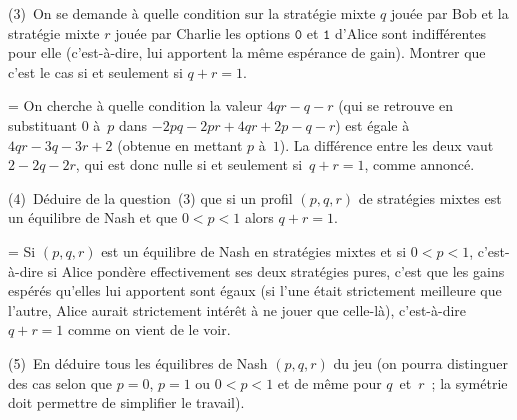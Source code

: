 \documentclass[12pt,a4paper]{article}
\theoremstyle{definition}
\newif\ifcorrige
\newenvironment{corrige}%
{\ifcorrige\relax\else\setbox0=\vbox\bgroup\fi%
\smallbreak\noindent{\underbar{\textit{Corrigé.}}\quad}}
{{\hbox{}\nobreak\hfill\checkmark}%
\ifcorrige\relax\else\egroup\fi\par}
\begin{document}
(3) On se demande à quelle condition sur la stratégie mixte $q$ jouée
par Bob et la stratégie mixte $r$ jouée par Charlie les options
$\mathtt{0}$ et $\mathtt{1}$ d'Alice sont indifférentes pour elle
(c'est-à-dire, lui apportent la même espérance de gain).  Montrer que
c'est le cas si et seulement si $q + r = 1$.

\begin{corrige}
On cherche à quelle condition la valeur $4qr - q - r$ (qui se retrouve
en substituant $0$ à $p$ dans $-2pq -2pr +4qr + 2p - q -r$) est égale
à $4qr - 3q - 3r + 2$ (obtenue en mettant $p$ à $1$).  La différence
entre les deux vaut $2 - 2q - 2r$, qui est donc nulle si et seulement
si $q+r = 1$, comme annoncé.
\end{corrige}

\smallbreak

(4) Déduire de la question (3) que si un profil $(p,q,r)$ de
stratégies mixtes est un équilibre de Nash et que $0<p<1$ alors
$q+r=1$.

\begin{corrige}
Si $(p,q,r)$ est un équilibre de Nash en stratégies mixtes et si
$0<p<1$, c'est-à-dire si Alice pondère effectivement ses deux
stratégies pures, c'est que les gains espérés qu'elles lui apportent
sont égaux (si l'une était strictement meilleure que l'autre, Alice
aurait strictement intérêt à ne jouer que celle-là), c'est-à-dire
$q+r=1$ comme on vient de le voir.
\end{corrige}

\smallbreak

(5) En déduire tous les équilibres de Nash $(p,q,r)$ du jeu (on pourra
distinguer des cas selon que $p=0$, $p=1$ ou $0<p<1$ et de même pour
$q$ et $r$ ; la symétrie doit permettre de simplifier le travail).
\end{document}
